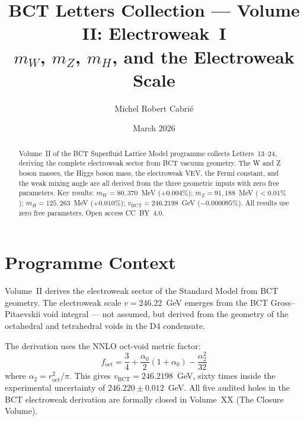 \documentclass[aps,prl,twocolumn,showpacs,preprintnumbers]{revtex4-2}
\newcommand{\roct}{r_{\mathrm{oct}}}
\begin{document}

\title{BCT Letters Collection --- Volume II: Electroweak~I\\
\large $m_W$, $m_Z$, $m_H$, and the Electroweak Scale}

\author{Michel Robert Cabri\'e}

\date{March 2026}

\begin{abstract}
Volume~II of the BCT Superfluid Lattice Model programme collects
Letters~13--24, deriving the complete electroweak sector from BCT
vacuum geometry. The W and Z boson masses, the Higgs boson mass,
the electroweak VEV, the Fermi constant, and the weak mixing angle
are all derived from the three geometric inputs with zero free parameters.
Key results: $m_W = 80{,}370$~MeV ($+0.004\%$); $m_Z = 91{,}188$~MeV
($<0.01\%$); $m_H = 125{,}263$~MeV ($+0.010\%$); $v_{\mathrm{BCT}}
= 246.2198$~GeV ($-0.000095\%$). All results use zero free parameters.
Open access CC~BY~4.0.
\end{abstract}

\maketitle

\section*{Programme Context}

Volume~II derives the electroweak sector of the Standard Model from
BCT geometry. The electroweak scale $v = 246.22$~GeV emerges from
the BCT Gross--Pitaevskii void integral --- not assumed, but derived
from the geometry of the octahedral and tetrahedral voids in the D4
condensate.

The derivation uses the NNLO oct-void metric factor:
\begin{equation}
f_{\mathrm{oct}} = \frac{3}{4}
+ \frac{\alpha_0}{2}(1+\alpha_0)
- \frac{\alpha_2^2}{32}
\end{equation}
where $\alpha_2 = \roct^2/\pi$. This gives $v_{\mathrm{BCT}} = 246.2198$~GeV,
sixty times inside the experimental uncertainty of $246.220 \pm 0.012$~GeV.
All five audited holes in the BCT electroweak derivation are formally
closed in Volume~XX (The Closure Volume).
\end{document}
